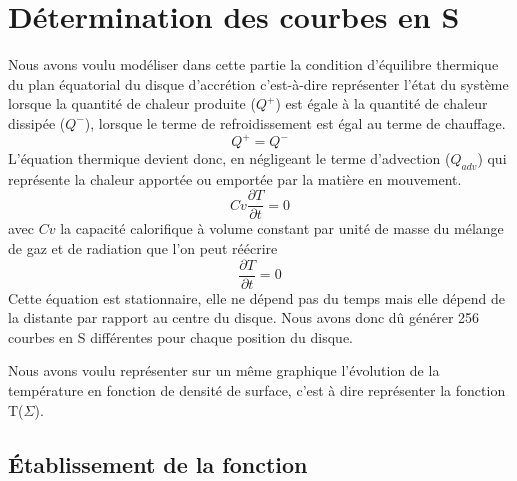 \section{Détermination des courbes en S}

Nous avons voulu modéliser dans cette partie la condition d'équilibre thermique du plan équatorial du disque d'accrétion c'est-à-dire représenter l'état du système lorsque la quantité de chaleur produite ($Q^+$) est égale à la quantité de chaleur dissipée ($Q^-$), lorsque le terme de refroidissement est égal au terme de chauffage.
\begin{equation}
Q^+ = Q^-
\end{equation}
L'équation thermique devient donc, en négligeant le terme d'advection ($Q_{adv}$) qui représente la chaleur apportée ou emportée par la matière en mouvement.
\begin{equation}
Cv\frac{\partial T}{\partial t} = 0
\end{equation}
avec $Cv$ la capacité calorifique à volume constant par unité de masse du mélange de gaz et de radiation que l'on peut réécrire
\begin{equation}
\frac{\partial T}{\partial t} = 0
\end{equation}
Cette équation est stationnaire, elle ne dépend pas du temps mais elle dépend de la distante par rapport au centre du disque. Nous avons donc dû générer 256 courbes en S différentes pour chaque position du disque.

Nous avons voulu représenter sur un même graphique l'évolution de la température en fonction de densité de surface, c'est à dire représenter la fonction T($\Sigma$).
\\   

\subsection{Établissement de la fonction}

